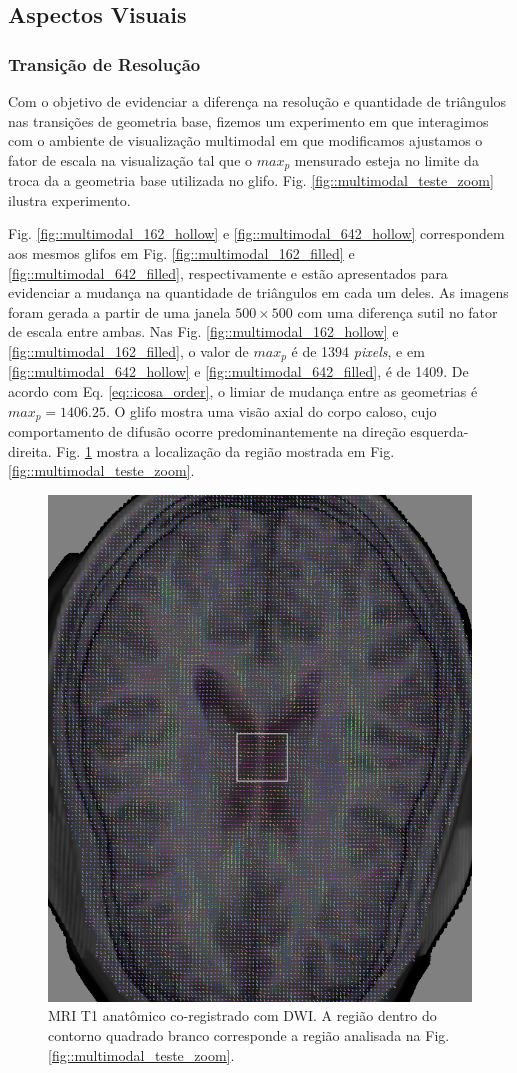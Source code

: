 \documentclass[
    12pt,                %
    oneside,            %
    a4paper,            %
    english,            %
    french,                %
    spanish,            %
    brazil                %
    ]{abntex2}
\begin{document}
\subsection{Aspectos Visuais}
\label{ssec::aspectos_visuais}

\subsubsection{Transição de Resolução}

Com o objetivo de evidenciar a diferença na resolução e quantidade de triângulos nas transições de geometria base, fizemos um experimento em que interagimos com o ambiente de visualização multimodal em que modificamos ajustamos o fator de escala na visualização tal que o $max_p$ mensurado esteja no limite da troca da a geometria base utilizada no glifo. Fig.  \ref{fig::multimodal_teste_zoom} ilustra experimento.

Fig. \ref{fig::multimodal_162_hollow} e \ref{fig::multimodal_642_hollow} correspondem aos mesmos glifos em Fig. \ref{fig::multimodal_162_filled} e \ref{fig::multimodal_642_filled}, respectivamente e estão apresentados para evidenciar a mudança na quantidade de triângulos em cada um deles. As imagens foram gerada a partir de uma janela $500 \times 500$ com uma diferença sutil no fator de escala entre ambas. Nas Fig. \ref{fig::multimodal_162_hollow} e \ref{fig::multimodal_162_filled}, o valor de $max_p$ é de 1394 \textit{pixels}, e em \ref{fig::multimodal_642_hollow} e \ref{fig::multimodal_642_filled}, é de 1409. De acordo com Eq. \ref{eq::icosa_order}, o limiar de mudança entre as geometrias é $max_p = 1406.25$.  O glifo mostra uma visão axial do corpo caloso, cujo comportamento de difusão ocorre predominantemente na direção esquerda-direita. Fig. \ref{fig::multimodal_teste_loc} mostra a localização da região mostrada em Fig. \ref{fig::multimodal_teste_zoom}.


\begin{figure}[ht]
    \centering
    \includegraphics[width=.56\linewidth, angle=0]{figs/Esquema_Glifo/Teste_transicao/base_teste_zoom.png}
    \caption{MRI T1 anatômico co-registrado com DWI. A região dentro do contorno quadrado branco corresponde a região analisada na Fig. \ref{fig::multimodal_teste_zoom}.}
    \label{fig::multimodal_teste_loc}
\end{figure}
\end{document}
